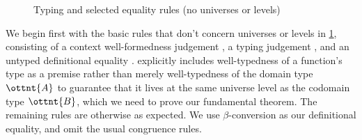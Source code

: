 \documentclass[a4paper,UKenglish,cleveref,autoref,thm-restate]{lipics-v2021}
\begin{document}
\begin{figure}
\begin{mathpar}
\end{mathpar}
%
\caption{Typing and selected equality rules (no universes or levels)}
\label{fig:typing:basic}
\end{figure}

We begin first with the basic rules that don't concern universes or levels in \cref{fig:typing:basic},
consisting of a context well-formedness judgement \fbox{$ \mathop{\vdash}  \Gamma $},
a typing judgement ,
and an untyped definitional equality .
 explicitly includes well-typedness of a function's type as a premise
rather than merely well-typedness of the domain type $\ottnt{A}$
to guarantee that it lives at the same universe level as the codomain type $\ottnt{B}$,
which we need to prove our fundamental theorem.
The remaining rules are otherwise as expected.
We use $\beta$-conversion as our definitional equality,
and omit the usual congruence rules.
\end{document}
